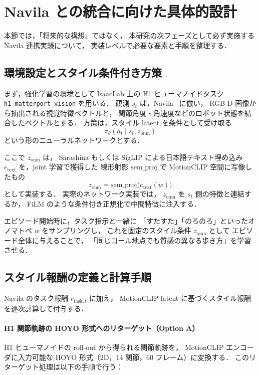 \documentclass[a4paper,10pt]{jsarticle}
\begin{document}
\section{Navila との統合に向けた具体的設計}

本節では，「将来的な構想」ではなく，
本研究の次フェーズとして必ず実施する Navila 連携実験について，
実装レベルで必要な要素と手順を整理する．

\subsection{環境設定とスタイル条件付き方策}

まず，強化学習の環境として IsaacLab 上の
H1 ヒューマノイドタスク \texttt{h1\_matterport\_vision} を用いる．
観測 $s_t$ は，Navila~\cite{navila} に倣い，
RGB-D 画像から抽出される視覚特徴ベクトルと，
関節角度・角速度などのロボット状態を結合したベクトルとする．
方策は，スタイル latent を条件として受け取る
\[
  \pi_\theta(a_t \mid s_t, z_{\mathrm{onm}})
\]
という形のニューラルネットワークとする．

ここで $z_{\mathrm{onm}}$ は，
Sarashina もしくは SigLIP による日本語テキスト埋め込み
$e_{\mathrm{text}}$ を，joint 学習で獲得した
線形射影 $\mathrm{sem\_proj}$ で MotionCLIP 空間に写像したもの
\[
  z_{\mathrm{onm}}
  = \mathrm{sem\_proj} \bigl( e_{\mathrm{text}}(w) \bigr)
\]
として実装する．
実際のネットワーク実装では，
$z_{\mathrm{onm}}$ を $s_t$ 側の特徴と連結するか，
FiLM のような条件付き正規化で中間特徴に注入する．

エピソード開始時に，タスク指示と一緒に
「すたすた」「のろのろ」といったオノマトペ $w$ をサンプリングし，
これを固定のスタイル条件 $z_{\mathrm{onm}}$ として
エピソード全体に与えることで，
「同じゴール地点でも質感の異なる歩き方」を学習させる．

\subsection{スタイル報酬の定義と計算手順}

Navila のタスク報酬 $r_{\mathrm{task},t}$ に加え，
MotionCLIP latent に基づくスタイル報酬を逐次計算して付与する．

\paragraph{H1 関節軌跡の HOYO 形式へのリターゲット（Option A）}
H1 ヒューマノイドの roll-out から得られる関節軌跡を，
MotionCLIP エンコーダに入力可能な HOYO 形式（2D，14 関節，60 フレーム）に変換する．
このリターゲット処理は以下の手順で行う：
\end{document}
